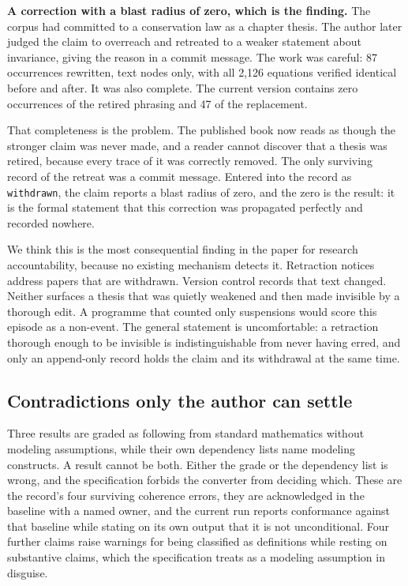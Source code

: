 \documentclass[journal]{IEEEtran}
\begin{document}
\textbf{A correction with a blast radius of zero, which is the finding.} The
corpus had committed to a conservation law as a chapter thesis. The author later
judged the claim to overreach and retreated to a weaker statement about
invariance, giving the reason in a commit message. The work was careful: 87
occurrences rewritten, text nodes only, with all 2{,}126 equations verified
identical before and after. It was also complete. The current version contains
zero occurrences of the retired phrasing and 47 of the replacement.

That completeness is the problem. The published book now reads as though the
stronger claim was never made, and a reader cannot discover that a thesis was
retired, because every trace of it was correctly removed. The only surviving
record of the retreat was a commit message. Entered into the record as
\texttt{withdrawn}, the claim reports a blast radius of zero, and the zero is the
result: it is the formal statement that this correction was propagated perfectly
and recorded nowhere.

We think this is the most consequential finding in the paper for research
accountability, because no existing mechanism detects it. Retraction notices
address papers that are withdrawn. Version control records that text changed.
Neither surfaces a thesis that was quietly weakened and then made invisible by a
thorough edit. A programme that counted only suspensions would score this episode
as a non-event. The general statement is uncomfortable: a retraction thorough
enough to be invisible is indistinguishable from never having erred, and only an
append-only record holds the claim and its withdrawal at the same time.

\subsection{Contradictions only the author can settle}

Three results are graded as following from standard mathematics without modeling
assumptions, while their own dependency lists name modeling constructs. A result
cannot be both. Either the grade or the dependency list is wrong, and the
specification forbids the converter from deciding which. These are the record's
four surviving coherence errors, they are acknowledged in the baseline with a
named owner, and the current run reports conformance against that baseline while
stating on its own output that it is not unconditional. Four further claims raise
warnings for being classified as definitions while resting on substantive claims,
which the specification treats as a modeling assumption in disguise.
\end{document}
